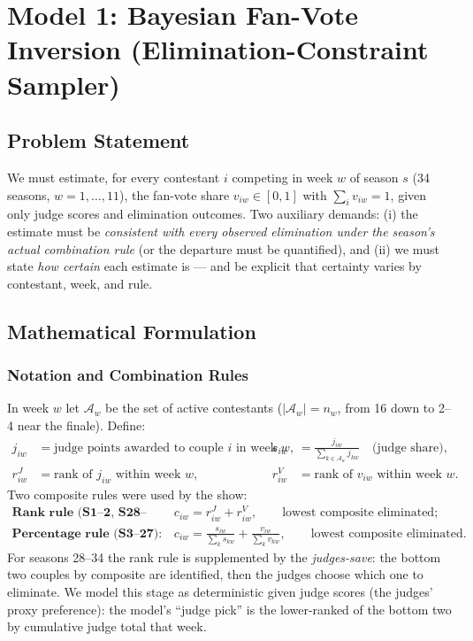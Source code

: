 \documentclass{article}
\begin{document}
\section{Model 1: Bayesian Fan-Vote Inversion (Elimination-Constraint Sampler)}
\label{sec:model1}

\subsection{Problem Statement}

We must estimate, for every contestant $i$ competing in week $w$ of season $s$ (34 seasons, $w = 1,\dots,11$), the fan-vote share $v_{iw} \in [0,1]$ with $\sum_i v_{iw} = 1$, given only judge scores and elimination outcomes. Two auxiliary demands: (i) the estimate must be \emph{consistent with every observed elimination under the season's actual combination rule} (or the departure must be quantified), and (ii) we must state \emph{how certain} each estimate is --- and be explicit that certainty varies by contestant, week, and rule.

\subsection{Mathematical Formulation}

\subsubsection{Notation and Combination Rules}

In week $w$ let $\mathcal{A}_w$ be the set of active contestants ($|\mathcal{A}_w| = n_w$, from 16 down to 2--4 near the finale). Define:
\begin{align}
j_{iw} &= \text{judge points awarded to couple } i \text{ in week } w, &
s_{iw} &= \frac{j_{iw}}{\sum_{k \in \mathcal{A}_w} j_{kw}} \quad \text{(judge share)}, \\
r^J_{iw} &= \text{rank of } j_{iw} \text{ within week } w, &
r^V_{iw} &= \text{rank of } v_{iw} \text{ within week } w.
\end{align}
Two composite rules were used by the show:
\begin{align}
\textbf{Rank rule (S1--2, S28--34):}\quad & c_{iw} = r^J_{iw} + r^V_{iw}, \qquad \text{lowest composite eliminated}; \label{eq:rank-rule}\\
\textbf{Percentage rule (S3--27):}\quad & c_{iw} = \frac{s_{iw}}{\sum_k s_{kw}} + \frac{v_{iw}}{\sum_k v_{kw}}, \qquad \text{lowest composite eliminated}. \label{eq:pct-rule}
\end{align}
For seasons 28--34 the rank rule is supplemented by the \emph{judges-save}: the bottom two couples by composite are identified, then the judges choose which one to eliminate. We model this stage as deterministic given judge scores (the judges' proxy preference): the model's ``judge pick'' is the lower-ranked of the bottom two by cumulative judge total that week.
\end{document}
